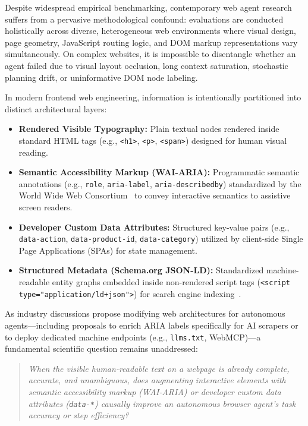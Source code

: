 \documentclass[11pt,a4paper]{article}
\begin{document}
Despite widespread empirical benchmarking, contemporary web agent research suffers from a pervasive methodological confound: evaluations are conducted holistically across diverse, heterogeneous web environments where visual design, page geometry, JavaScript routing logic, and DOM markup representations vary simultaneously. On complex websites, it is impossible to disentangle whether an agent failed due to visual layout occlusion, long context saturation, stochastic planning drift, or uninformative DOM node labeling.

In modern frontend web engineering, information is intentionally partitioned into distinct architectural layers:
\begin{itemize}
    \item \textbf{Rendered Visible Typography:} Plain textual nodes rendered inside standard HTML tags (e.g., \texttt{<h1>}, \texttt{<p>}, \texttt{<span>}) designed for human visual reading.
    \item \textbf{Semantic Accessibility Markup (WAI-ARIA):} Programmatic semantic annotations (e.g., \texttt{role}, \texttt{aria-label}, \texttt{aria-describedby}) standardized by the World Wide Web Consortium~\cite{wai_aria11} to convey interactive semantics to assistive screen readers.
    \item \textbf{Developer Custom Data Attributes:} Structured key-value pairs (e.g., \texttt{data-action}, \texttt{data-product-id}, \texttt{data-category}) utilized by client-side Single Page Applications (SPAs) for state management.
    \item \textbf{Structured Metadata (Schema.org JSON-LD):} Standardized machine-readable entity graphs embedded inside non-rendered script tags (\texttt{<script type="application/ld+json">}) for search engine indexing~\cite{schemaorg}.
\end{itemize}

As industry discussions propose modifying web architectures for autonomous agents---including proposals to enrich ARIA labels specifically for AI scrapers or to deploy dedicated machine endpoints (e.g., \texttt{llms.txt}, WebMCP)---a fundamental scientific question remains unaddressed:
\begin{quote}
\textit{When the visible human-readable text on a webpage is already complete, accurate, and unambiguous, does augmenting interactive elements with semantic accessibility markup (WAI-ARIA) or developer custom data attributes (\texttt{data-*}) causally improve an autonomous browser agent's task accuracy or step efficiency?}
\end{quote}
\end{document}
